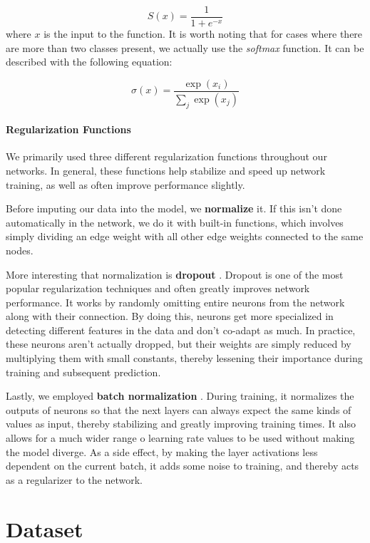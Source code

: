 \documentclass[times, utf8, diplomski, english]{fer_eng}
\begin{document}
\[ S(x) = \frac{1}{1 + e^{-x}} \]
where $x$ is the input to the function. It is worth noting that for cases where there are more than two classes present, we actually use the \textit{softmax} function. It can be described with the following equation:

\[ \sigma(x) = \frac{\exp (x_i)}{\sum_j \exp (x_j)} \]

\subsubsection{Regularization Functions}
\label{subsubsec:regularization functions}

We primarily used three different regularization functions throughout our networks. In general, these functions help stabilize and speed up network training, as well as often improve performance slightly.

Before imputing our data into the model, we \textbf{normalize} it. If this isn't done automatically in the network, we do it with built-in functions, which involves simply dividing an edge weight with all other edge weights connected to the same nodes.

More interesting that normalization is \textbf{dropout} \cite{dropout} \cite{dropout2}. Dropout is one of the most popular regularization techniques and often greatly improves network performance. It works by randomly omitting entire neurons from the network along with their connection. By doing this, neurons get more specialized in detecting different features in the data and don't co-adapt as much. In practice, these neurons aren't actually dropped, but their weights are simply reduced by multiplying them with small constants, thereby lessening their importance during training and subsequent prediction.

Lastly, we employed \textbf{batch normalization} \cite{bn}. During training, it normalizes the outputs of neurons so that the next layers can always expect the same kinds of values as input, thereby stabilizing and greatly improving training times. It also allows for a much wider range o learning rate values to be used without making the model diverge. As a side effect, by making the layer activations less dependent on the current batch, it adds some noise to training, and thereby acts as a regularizer to the network.

\chapter{Dataset}
\label{ch:dataset}
\end{document}
